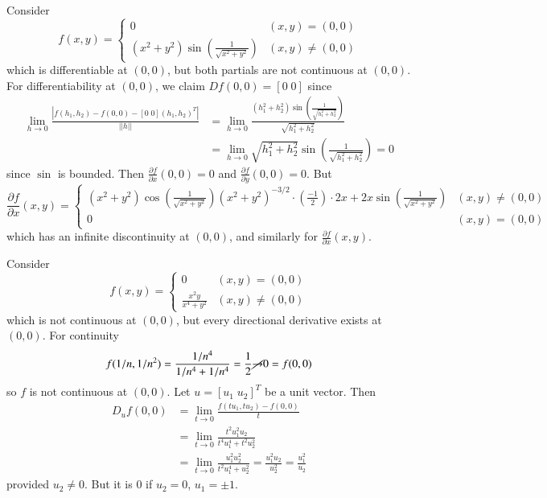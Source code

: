 \begin{example}
    Consider \begin{equation*}
        f(x,y) = \left\{\begin{array}{lc} 0 & (x,y) = (0,0) \\ (x^2+y^2)\sin\left(\frac{1}{\sqrt{x^2+y^2}}\right) & (x,y) \neq (0,0)\end{array}\right.
    \end{equation*}
    which is differentiable at $(0,0)$, but both partials are not continuous at $(0,0)$. For differentiability at $(0,0)$, we claim $Df(0,0) = [0\;0]$ since \begin{align*}
        \lim\limits_{h\rightarrow 0}\frac{|f(h_1,h_2) - f(0,0) - [0\;0](h_1,h_2)^T|}{||h||} &= \lim\limits_{h\rightarrow 0}\frac{(h_1^2+h_2^2)\sin\left(\frac{1}{\sqrt{h_1^2+h_2^2}}\right)}{\sqrt{h_1^2+h_2^2}} \\
        &= \lim\limits_{h\rightarrow 0}\sqrt{h_1^2+h_2^2}\sin\left(\frac{1}{\sqrt{h_1^2+h_2^2}}\right) = 0
    \end{align*}
    since $\sin$ is bounded. Then $\frac{\partial f}{\partial x}(0,0) = 0$ and $\frac{\partial f}{\partial y}(0,0) = 0$. But \begin{equation*}
        \frac{\partial f}{\partial x}(x,y) = \left\{\begin{array}{cc} (x^2+y^2)\cos\left(\frac{1}{\sqrt{x^2+y^2}}\right)(x^2+y^2)^{-3/2}\cdot\left(\frac{-1}{2}\right)\cdot 2x + 2x\sin\left(\frac{1}{\sqrt{x^2+y^2}}\right) & (x,y)\neq (0,0) \\ 0 & (x,y) = (0,0) \end{array}\right.
    \end{equation*}
    which has an infinite discontinuity at $(0,0)$, and similarly for $\frac{\partial f}{\partial x}(x,y)$.
\end{example}



\begin{example}
    Consider \begin{equation*}
        f(x,y) = \left\{\begin{array}{cc} 0 & (x,y) = (0,0) \\ \frac{x^2y}{x^4+y^2} & (x,y) \neq (0,0) \end{array}\right.
    \end{equation*}
    which is not continuous at $(0,0)$, but every directional derivative exists at $(0,0)$. For continuity $$f(1/n,1/n^2) = \frac{1/n^4}{1/n^4+1/n^4} = \frac{1}{2}\cancel{\rightarrow } 0 = f(0,0)$$ so $f$ is not continuous at $(0,0)$. Let $u = [u_1\;u_2]^T$ be a unit vector. Then \begin{align*}
        D_uf(0,0) &= \lim\limits_{t\rightarrow 0}\frac{f(tu_1,tu_2) - f(0,0)}{t} \\
        &= \lim\limits_{t\rightarrow 0}\frac{t^2u_1^2u_2}{t^4u_1^4+t^2u_2^2} \\
        &= \lim\limits_{t\rightarrow 0}\frac{u_1^2u_2^2}{t^2u_1^4+u_2^2} = \frac{u_1^2u_2}{u_2^2} = \frac{u_1^2}{u_2}
    \end{align*}
    provided $u_2 \neq 0$. But it is $0$ if $u_2 = 0$, $u_1 = \pm 1$.
\end{example}

